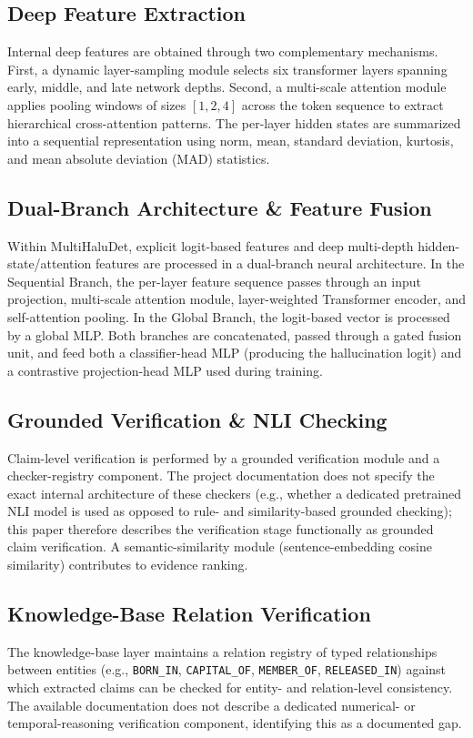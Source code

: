 \documentclass[conference]{IEEEtran}
\begin{document}
\subsection{Deep Feature Extraction}
Internal deep features are obtained through two complementary mechanisms. First, a dynamic layer-sampling module selects six transformer layers spanning early, middle, and late network depths. Second, a multi-scale attention module applies pooling windows of sizes $[1, 2, 4]$ across the token sequence to extract hierarchical cross-attention patterns. The per-layer hidden states are summarized into a sequential representation using norm, mean, standard deviation, kurtosis, and mean absolute deviation (MAD) statistics.

\subsection{Dual-Branch Architecture \& Feature Fusion}
Within MultiHaluDet, explicit logit-based features and deep multi-depth hidden-state/attention features are processed in a dual-branch neural architecture. In the Sequential Branch, the per-layer feature sequence passes through an input projection, multi-scale attention module, layer-weighted Transformer encoder, and self-attention pooling. In the Global Branch, the logit-based vector is processed by a global MLP. Both branches are concatenated, passed through a gated fusion unit, and feed both a classifier-head MLP (producing the hallucination logit) and a contrastive projection-head MLP used during training.

\subsection{Grounded Verification \& NLI Checking}
Claim-level verification is performed by a grounded verification module and a checker-registry component. The project documentation does not specify the exact internal architecture of these checkers (e.g., whether a dedicated pretrained NLI model is used as opposed to rule- and similarity-based grounded checking); this paper therefore describes the verification stage functionally as grounded claim verification. A semantic-similarity module (sentence-embedding cosine similarity) contributes to evidence ranking.

\subsection{Knowledge-Base Relation Verification}
The knowledge-base layer maintains a relation registry of typed relationships between entities (e.g., \texttt{BORN\_IN}, \texttt{CAPITAL\_OF}, \texttt{MEMBER\_OF}, \texttt{RELEASED\_IN}) against which extracted claims can be checked for entity- and relation-level consistency. The available documentation does not describe a dedicated numerical- or temporal-reasoning verification component, identifying this as a documented gap.
\end{document}

